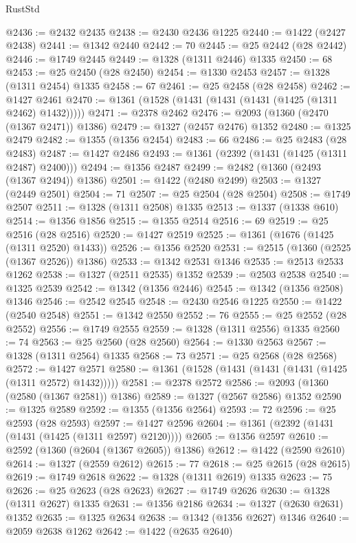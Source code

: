 \begin{lexlean}{RustStd}
\begin{coremodule}
@2436 := @2432 @2435
@2438 := @2430 @2436 @1225
@2440 := @1422 (@2427 @2438)
@2441 := @1342 @2440
@2442 := 70
@2445 := @25 @2442 (@28 @2442)
@2446 := @1749 @2445
@2449 := @1328 (@1311 @2446) @1335
@2450 := 68
@2453 := @25 @2450 (@28 @2450)
@2454 := @1330 @2453
@2457 := @1328 (@1311 @2454) @1335
@2458 := 67
@2461 := @25 @2458 (@28 @2458)
@2462 := @1427 @2461
@2470 := @1361 (@1528 (@1431 (@1431 (@1431 (@1425 (@1311 @2462) @1432)))))
@2471 := @2378 @2462
@2476 := @2093 (@1360 (@2470 (@1367 @2471)) @1386)
@2479 := @1327 (@2457 @2476) @1352
@2480 := @1325 @2479
@2482 := @1355 (@1356 @2454)
@2483 := 66
@2486 := @25 @2483 (@28 @2483)
@2487 := @1427 @2486
@2493 := @1361 (@2392 (@1431 (@1425 (@1311 @2487) @2400)))
@2494 := @1356 @2487
@2499 := @2482 (@1360 (@2493 (@1367 @2494)) @1386)
@2501 := @1422 (@2480 @2499)
@2503 := @1327 (@2449 @2501)
@2504 := 71
@2507 := @25 @2504 (@28 @2504)
@2508 := @1749 @2507
@2511 := @1328 (@1311 @2508) @1335
@2513 := @1337 (@1338 @610)
@2514 := @1356 @1856
@2515 := @1355 @2514
@2516 := 69
@2519 := @25 @2516 (@28 @2516)
@2520 := @1427 @2519
@2525 := @1361 (@1676 (@1425 (@1311 @2520) @1433))
@2526 := @1356 @2520
@2531 := @2515 (@1360 (@2525 (@1367 @2526)) @1386)
@2533 := @1342 @2531 @1346
@2535 := @2513 @2533 @1262
@2538 := @1327 (@2511 @2535) @1352
@2539 := @2503 @2538
@2540 := @1325 @2539
@2542 := @1342 (@1356 @2446)
@2545 := @1342 (@1356 @2508) @1346
@2546 := @2542 @2545
@2548 := @2430 @2546 @1225
@2550 := @1422 (@2540 @2548)
@2551 := @1342 @2550
@2552 := 76
@2555 := @25 @2552 (@28 @2552)
@2556 := @1749 @2555
@2559 := @1328 (@1311 @2556) @1335
@2560 := 74
@2563 := @25 @2560 (@28 @2560)
@2564 := @1330 @2563
@2567 := @1328 (@1311 @2564) @1335
@2568 := 73
@2571 := @25 @2568 (@28 @2568)
@2572 := @1427 @2571
@2580 := @1361 (@1528 (@1431 (@1431 (@1431 (@1425 (@1311 @2572) @1432)))))
@2581 := @2378 @2572
@2586 := @2093 (@1360 (@2580 (@1367 @2581)) @1386)
@2589 := @1327 (@2567 @2586) @1352
@2590 := @1325 @2589
@2592 := @1355 (@1356 @2564)
@2593 := 72
@2596 := @25 @2593 (@28 @2593)
@2597 := @1427 @2596
@2604 := @1361 (@2392 (@1431 (@1431 (@1425 (@1311 @2597) @2120))))
@2605 := @1356 @2597
@2610 := @2592 (@1360 (@2604 (@1367 @2605)) @1386)
@2612 := @1422 (@2590 @2610)
@2614 := @1327 (@2559 @2612)
@2615 := 77
@2618 := @25 @2615 (@28 @2615)
@2619 := @1749 @2618
@2622 := @1328 (@1311 @2619) @1335
@2623 := 75
@2626 := @25 @2623 (@28 @2623)
@2627 := @1749 @2626
@2630 := @1328 (@1311 @2627) @1335
@2631 := @1356 @2186
@2634 := @1327 (@2630 @2631) @1352
@2635 := @1325 @2634
@2638 := @1342 (@1356 @2627) @1346
@2640 := @2059 @2638 @1262
@2642 := @1422 (@2635 @2640)

\end{coremodule}
\end{lexlean}
